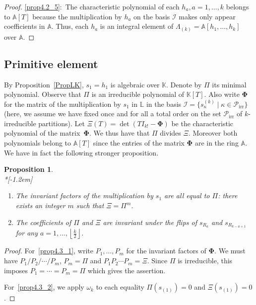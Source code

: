 \documentclass[10pt,a4paper]{amsart}
\newtheorem{prop}[theorem]{Proposition}
\theoremstyle{definition}
\DeclareMathOperator{\irr}{irr}
\begin{document}
\begin{proof}
\eqref{prop4.2_5}:~The characteristic polynomial of each $h_{a},a=1,\ldots,k$ belongs to
$\mathbb{A}[T]$ because the multiplication by $h_{a}$ on the basis
$\mathcal{I}$ makes only appear coefficients in $\mathbb{A}$. Thus, each
$h_{a}$ is an integral element of $\Lambda_{(k)}=\mathbb{A}[h_{1},\ldots
,h_{k}]$ over $\mathbb{A}.$
\end{proof}

\subsection{Primitive element}

\label{subsec_primitiveel}By Proposition~\ref{PropLK}, $s_{1}=h_{1}$ is
algebraic over $\mathbb{K}$. Denote by $\Pi$ its minimal polynomial. Observe
that $\Pi$ is an irreducible polynomial of $\mathbb{K}[T]$. Also write
$\boldsymbol{\Phi}$ for the matrix of the multiplication by $s_{1}$ in
$\mathbb{L}$ in the basis $\mathcal{I}=\{s_{\kappa}^{(k)}\mid\kappa
\in\mathcal{P}_{\irr }\}$ (here, we assume we have fixed once and for all a
total order on the set $\mathcal{P}_{\irr }$ of $k$-irreducible
partitions). Let $\Xi(T)=\det (TI_{k!}-\boldsymbol{\Phi})$ be the
characteristic polynomial of the matrix~$\boldsymbol{\Phi}$. We thus have that
$\Pi$ divides $\Xi$. Moreover both polynomials belong to $\mathbb{A}[T]$ since
the entries of the matrix $\boldsymbol{\Phi}$ are in the ring $\mathbb{A}$. We
have in fact the following stronger proposition.

\begin{prop}\label{Prop_InvSim}\ \\*[-1.2em]

\begin{enumerate}
\item\label{prop4.3_1} The invariant factors of the multiplication by $s_{1}$ are all equal to
$\Pi$: there exists an integer $m$ such that $\Xi=\Pi^{m}.$

\item\label{prop4.3_2} The coefficients of $\Pi$ and $\Xi$ are invariant under the flips of
$s_{R_{a}}$ and $s_{R_{k-a+1}}$ for any $a=1,\ldots,\left\lfloor \frac{k}%
{2}\right\rfloor $.
\end{enumerate}
\end{prop}

\begin{proof}
For~\eqref{prop4.3_1}, write $P_{1},\ldots,P_{m}$ for the invariant factors of $\boldsymbol{\Phi}%
$. We must have $P_{1}/P_{2}/\cdots/P_{m}$, $P_{m}=\Pi$ and $P_{1}P_{2}\cdots
P_{m}=\Xi$. Since $\Pi$ is irreducible, this imposes $P_{1}=\cdots=P_{m}=\Pi$
which gives the assertion.

For~\eqref{prop4.3_2}, we apply $\omega_{k}$ to each equality $\Pi(s_{(1)})=0$ and $\Xi
(s_{(1)})=0$.
\end{proof}
\end{document}
